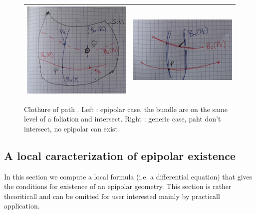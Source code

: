 \documentclass[a4paper]{article}
\begin{document}
\begin{figure}
\centering
\begin{tabular}{||c|c||}
 \hline \hline
\includegraphics[width=8cm]{FIGS/ClothPathEpip.jpg} &
\includegraphics[width=8cm]{FIGS/ClothPathNonEpip.jpg} 
 \\ \hline \hline
\end{tabular}
\caption{Clothure of path . Left : epipolar case, the bundle are on the same level of a foliation and intersect.
Right : generic case, paht don't intersect, no epipolar can exist}
\label{FigClothPath}
\end{figure}




\subsection{A local caracterization of epipolar existence}

In this section we compute a local formula (i.e. a differential equation) that gives the conditions for
existence of an epipolar geometry. This section is rather theoriticall and
can be omitted for user interested mainly by practicall application.
\end{document}

